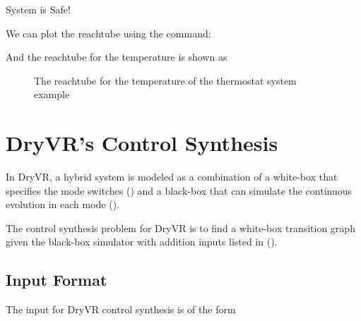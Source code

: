 \documentclass[letterpaper,10pt,english]{sphinxmanual}
\begin{document}
\begin{sphinxVerbatim}[commandchars=\\\{\}]
System is Safe!
\end{sphinxVerbatim}

We can plot the reachtube using the command:

\begin{sphinxVerbatim}[commandchars=\\\{\}]
 
\end{sphinxVerbatim}

And the reachtube for the temperature is shown as
\begin{figure}[htbp]
\centering
\capstart

\noindent{}
\caption{The reachtube for the temperature of the thermostat system example}\label{\detokenize{dryvr's_language:id2}}\end{figure}


\chapter{DryVR's Control Synthesis}
\label{\detokenize{dryvr's_control_synthesis:dryvr-s-control-synthesis}}\label{\detokenize{dryvr's_control_synthesis::doc}}
In DryVR,  a hybrid system is modeled as a combination of a white-box that specifies the mode switches ({\hyperref[\detokenize{dryvr's_language:transition-graph-label}]{}}) and a black-box that can simulate the continuous evolution in each mode ({\hyperref[\detokenize{dryvr's_language:black-box-label}]{}}).

The control synthesis problem for DryVR is to find a white-box transition graph given the black-box simulator with addition inputs listed in ({\hyperref[\detokenize{dryvr's_control_synthesis:input-format-control-label}]{}}).


\section{Input Format}
\label{\detokenize{dryvr's_control_synthesis:input-format}}\label{\detokenize{dryvr's_control_synthesis:input-format-control-label}}
The input for DryVR control synthesis is of the form
\end{document}
